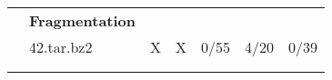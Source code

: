 \documentclass{article}           %
\begin{document}
\begin{table}[]
\begin{tabular}{lllccccc}
\multicolumn{1}{|l|}{}                               & \multicolumn{2}{c|}{\textbf{Fragmentation}}                             & \multicolumn{5}{c|}{}               \\ \cline{2-8} 
\multicolumn{1}{|l|}{}                               & \multicolumn{2}{l|}{42.tar.bz2}                                         & \multicolumn{1}{c|}{\textsf{X}}       & \multicolumn{1}{c|}{\textsf{X}}       & \multicolumn{1}{c|}{0/55}           & \multicolumn{1}{c|}{4/20}      & \multicolumn{1}{c|}{0/39}        \\ \hline
                                                     &                                           &                             & \multicolumn{1}{l}{}        & \multicolumn{1}{l}{}        & \multicolumn{1}{l}{}            & \multicolumn{1}{l}{}       & \multicolumn{1}{l}{}         \\
                                                     &                                           &                             & \multicolumn{1}{l}{}        & \multicolumn{1}{l}{}        & \multicolumn{1}{l}{}            & \multicolumn{1}{l}{}       & \multicolumn{1}{l}{}        
\end{tabular}
\end{table}
\end{document}
